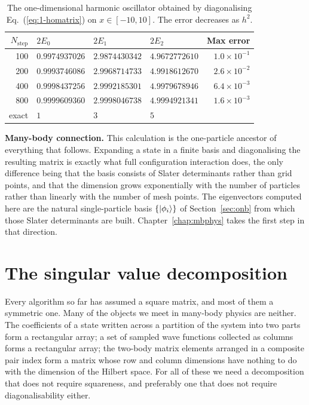 \begin{table}[h]
\centering
\renewcommand{\arraystretch}{1.25}
\setlength{\tabcolsep}{10pt}
\begin{tabular}{rlllr}
\toprule
$N_{\mathrm{step}}$ & $2E_0$ & $2E_1$ & $2E_2$ & \textbf{Max error}\\
\midrule
100 & $0.9974937026$ & $2.9874430342$ & $4.9672772610$ & $1.0\times10^{-1}$\\
200 & $0.9993746086$ & $2.9968714733$ & $4.9918612670$ & $2.6\times10^{-2}$\\
400 & $0.9998437256$ & $2.9992185301$ & $4.9979678946$ & $6.4\times10^{-3}$\\
800 & $0.9999609360$ & $2.9998046738$ & $4.9994921341$ & $1.6\times10^{-3}$\\
\midrule
exact & $1$ & $3$ & $5$ & \\
\bottomrule
\end{tabular}
\caption{The one-dimensional harmonic oscillator obtained by diagonalising
Eq.~(\ref{eq:1-homatrix}) on $x\in[-10,10]$.  The error decreases as $h^2$.}
\label{tab:schrodinger}
\end{table}

\begin{notebox}
\textbf{Many-body connection.} This calculation is the one-particle ancestor
of everything that follows.  Expanding a state in a finite basis and
diagonalising the resulting matrix is exactly what full configuration
interaction does, the only difference being that the basis consists of Slater
determinants rather than grid points, and that the dimension grows
exponentially with the number of particles rather than linearly with the
number of mesh points.  The eigenvectors computed here are the natural
single-particle basis $\{\vert \phi_i \rangle\}$ of Section~\ref{sec:onb} from which
those Slater determinants are built.  Chapter~\ref{chap:mbphys} takes the
first step in that direction.
\end{notebox}


\section{The singular value decomposition}
\label{sec:svd}

Every algorithm so far has assumed a square matrix, and most of them a
symmetric one.  Many of the objects we meet in many-body physics are neither.
The coefficients of a state written across a partition of the system into two
parts form a rectangular array; a set of sampled wave functions collected as
columns forms a rectangular array; the two-body matrix elements arranged in a
composite pair index form a matrix whose row and column dimensions have
nothing to do with the dimension of the Hilbert space.  For all of these we
need a decomposition that does not require squareness, and preferably one
that does not require diagonalisability either.

